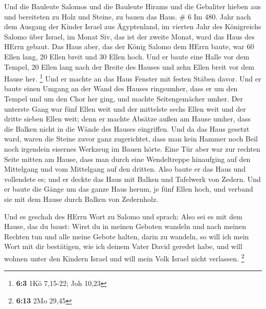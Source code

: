  Und die Bauleute Salomos und die Bauleute Hirams und die
Gebaliter hieben aus und bereiteten zu Holz und Steine, zu bauen das
Haus. \# 6  Im 480. Jahr nach dem Ausgang der Kinder Israel
aus Ägyptenland, im vierten Jahr des Königreichs Salomo über Israel, im
Monat Siv, das ist der zweite Monat, ward das Haus des HErrn gebaut.
 Das Haus aber, das der König Salomo dem HErrn baute, war 60
Ellen lang, 20 Ellen breit und 30 Ellen hoch.  Und er baute
eine Halle vor dem Tempel, 20 Ellen lang nach der Breite des Hauses und
zehn Ellen breit vor dem Hause her. \footnote{\textbf{6:3} 1Kö 7,15-22;
  Joh 10,23}  Und er machte an das Haus Fenster mit festen
Stäben davor.  Und er baute einen Umgang an der Wand des
Hauses ringsumher, dass er um den Tempel und um den Chor her ging, und
machte Seitengemächer umher.  Der unterste Gang war fünf
Ellen weit und der mittelste sechs Ellen weit und der dritte sieben
Ellen weit; denn er machte Absätze außen am Hause umher, dass die Balken
nicht in die Wände des Hauses eingriffen.  Und da das Haus
gesetzt ward, waren die Steine zuvor ganz zugerichtet, dass man kein
Hammer noch Beil noch irgendein eisernes Werkzeug im Bauen hörte.
 Eine Tür aber war zur rechten Seite mitten am Hause, dass
man durch eine Wendeltreppe hinaufging auf den Mittelgang und vom
Mittelgang auf den dritten.  Also baute er das Haus und
vollendete es; und er deckte das Haus mit Balken und Tafelwerk von
Zedern.  Und er baute die Gänge um das ganze Haus herum, je
fünf Ellen hoch, und verband sie mit dem Hause durch Balken von
Zedernholz.

 Und es geschah des HErrn Wort zu Salomo und sprach:
 Also sei es mit dem Hause, das du baust: Wirst du in
meinen Geboten wandeln und nach meinen Rechten tun und alle meine Gebote
halten, darin zu wandeln, so will ich mein Wort mit dir bestätigen, wie
ich deinem Vater David geredet habe,  und will wohnen unter
den Kindern Israel und will mein Volk Israel nicht verlassen.
\footnote{\textbf{6:13} 2Mo 29,45}

